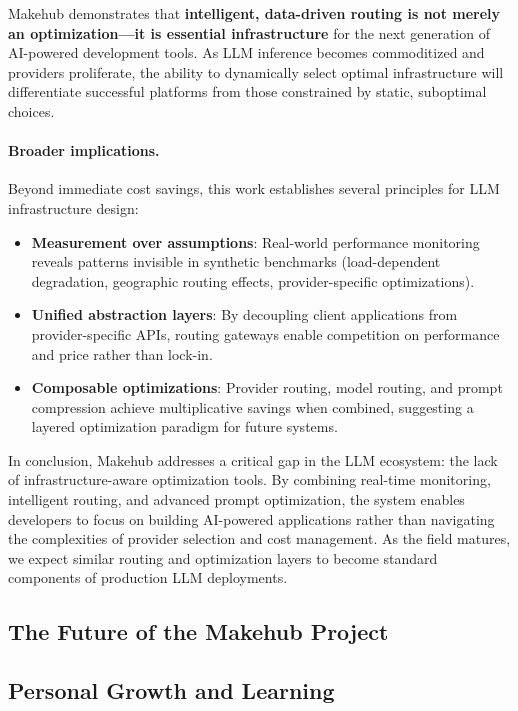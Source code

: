 \documentclass[english]{article}
\begin{document}
Makehub demonstrates that \textbf{intelligent, data-driven routing is not merely an optimization—it is essential infrastructure} for the next generation of AI-powered development tools. As LLM inference becomes commoditized and providers proliferate, the ability to dynamically select optimal infrastructure will differentiate successful platforms from those constrained by static, suboptimal choices.

\paragraph{Broader implications.}

Beyond immediate cost savings, this work establishes several principles for LLM infrastructure design:
\begin{itemize}
    \item \textbf{Measurement over assumptions}: Real-world performance monitoring reveals patterns invisible in synthetic benchmarks (load-dependent degradation, geographic routing effects, provider-specific optimizations).
    \item \textbf{Unified abstraction layers}: By decoupling client applications from provider-specific APIs, routing gateways enable competition on performance and price rather than lock-in.
    \item \textbf{Composable optimizations}: Provider routing, model routing, and prompt compression achieve multiplicative savings when combined, suggesting a layered optimization paradigm for future systems.
\end{itemize}

In conclusion, Makehub addresses a critical gap in the LLM ecosystem: the lack of infrastructure-aware optimization tools. By combining real-time monitoring, intelligent routing, and advanced prompt optimization, the system enables developers to focus on building AI-powered applications rather than navigating the complexities of provider selection and cost management. As the field matures, we expect similar routing and optimization layers to become standard components of production LLM deployments.

\subsection{The Future of the Makehub Project}
\subsection{Personal Growth and Learning}


\printbibliography
\end{document}
